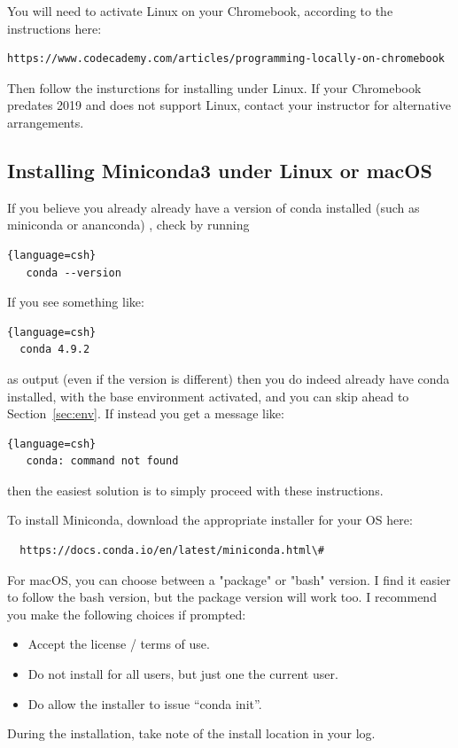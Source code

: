 You will need to activate Linux on your Chromebook, according to the instructions here:

\begin{verbatim}
https://www.codecademy.com/articles/programming-locally-on-chromebook
\end{verbatim}

Then follow the insturctions for installing under Linux.  If your
Chromebook predates 2019 and does not support Linux, contact your
instructor for alternative arrangements.

\subsection{Installing Miniconda3 under Linux or macOS}

If you believe you already already have a version of conda installed
(such as miniconda or ananconda) , check by running
\begin{lstlisting}{language=csh}
   conda --version
\end{lstlisting}
If you see something like:
\begin{lstlisting}{language=csh}
  conda 4.9.2
\end{lstlisting}
as output (even if the version is different) then you do indeed already have conda
installed, with the base environment activated, and you can skip ahead to
Section~\ref{sec:env}.  If instead you get a message like:
\begin{lstlisting}{language=csh}
   conda: command not found
\end{lstlisting}
then the easiest solution is to simply proceed with these instructions.

To install Miniconda, download the appropriate installer for your OS
here:
\begin{verbatim}
  https://docs.conda.io/en/latest/miniconda.html\#
\end{verbatim}
For macOS, you can choose between a "package" or "bash" version. I
find it easier to follow the bash version, but the package version
will work too. I recommend you make the following choices if prompted:
\begin{itemize}
\item Accept the license / terms of use.
\item Do not install for all users, but just one the current user.
\item Do allow the installer to issue ``conda init''.
\end{itemize}
During the installation, take note of the install location in your log.

